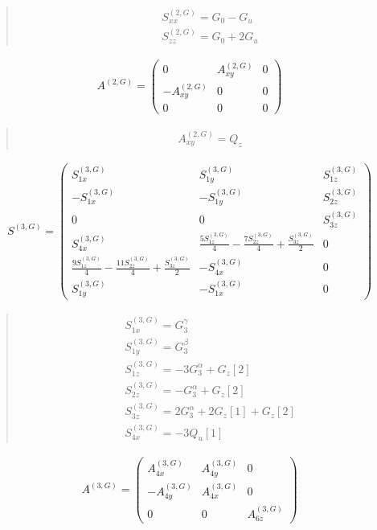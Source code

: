 \documentclass[fleqn,10pt]{jsarticle}
\begin{document}
\begin{quote}
\begin{align*}
& S^{(2,G)}_{xx} = G_{0} - G_{u} \\
& S^{(2,G)}_{zz} = G_{0} + 2 G_{u}
\end{align*}
\end{quote}
\begin{align*}
A^{(2,G)} = \begin{pmatrix} 0 & A^{(2,G)}_{xy} & 0 \\ - A^{(2,G)}_{xy} & 0 & 0 \\ 0 & 0 & 0 \end{pmatrix}
\end{align*}
\begin{quote}
\begin{align*}
& A^{(2,G)}_{xy} = Q_{z}
\end{align*}
\end{quote}
\begin{align*}
S^{(3,G)} = \begin{pmatrix} S^{(3,G)}_{1x} & S^{(3,G)}_{1y} & S^{(3,G)}_{1z} \\ - S^{(3,G)}_{1x} & - S^{(3,G)}_{1y} & S^{(3,G)}_{2z} \\ 0 & 0 & S^{(3,G)}_{3z} \\ S^{(3,G)}_{4x} & \frac{5 S^{(3,G)}_{1z}}{4} - \frac{7 S^{(3,G)}_{2z}}{4} + \frac{S^{(3,G)}_{3z}}{2} & 0 \\ \frac{9 S^{(3,G)}_{1z}}{4} - \frac{11 S^{(3,G)}_{2z}}{4} + \frac{S^{(3,G)}_{3z}}{2} & - S^{(3,G)}_{4x} & 0 \\ S^{(3,G)}_{1y} & - S^{(3,G)}_{1x} & 0 \end{pmatrix}
\end{align*}
\begin{quote}
\begin{align*}
& S^{(3,G)}_{1x} = G_{3}^{\gamma} \\
& S^{(3,G)}_{1y} = G_{3}^{\beta} \\
& S^{(3,G)}_{1z} = - 3 G_{3}^{\alpha} + G_{z}[2] \\
& S^{(3,G)}_{2z} = - G_{3}^{\alpha} + G_{z}[2] \\
& S^{(3,G)}_{3z} = 2 G_{3}^{\alpha} + 2 G_{z}[1] + G_{z}[2] \\
& S^{(3,G)}_{4x} = - 3 Q_{u}[1]
\end{align*}
\end{quote}
\begin{align*}
A^{(3,G)} = \begin{pmatrix} A^{(3,G)}_{4x} & A^{(3,G)}_{4y} & 0 \\ - A^{(3,G)}_{4y} & A^{(3,G)}_{4x} & 0 \\ 0 & 0 & A^{(3,G)}_{6z} \end{pmatrix}
\end{align*}
\end{document}
